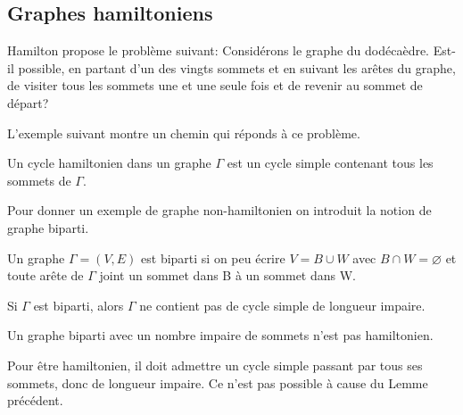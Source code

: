 
\subsection{Graphes hamiltoniens}

Hamilton propose le problème suivant: Considérons le graphe du dodécaèdre. Est-il possible, en partant d'un des vingts sommets et en suivant les arêtes du graphe, de visiter tous les sommets une et une seule fois et de revenir au sommet de départ? 

L'exemple suivant montre un chemin qui réponds à ce problème. 

\begin{exmp}

\end{exmp}



\newpage

\begin{defn}
Un cycle hamiltonien dans un graphe $\Gamma$ est un cycle simple contenant tous les sommets de $\Gamma$. 
\end{defn}

Pour donner un exemple de graphe non-hamiltonien on introduit la notion de graphe biparti. 

\begin{defn}
Un graphe $\Gamma = (V,E)$ est biparti si on peu écrire $V=B \cup W$ avec $B \cap W = \varnothing $ et toute arête de $\Gamma$ joint un sommet dans B à un sommet dans W.
\end{defn}

\begin{exmp}

\end{exmp}



\begin{lemme}
Si $\Gamma$ est biparti, alors $\Gamma$ ne contient pas de cycle simple de longueur impaire.
\end{lemme}

\begin{thrm}
Un graphe biparti avec un nombre impaire de sommets n'est pas hamiltonien.
\end{thrm}

\begin{demo}
Pour être hamiltonien, il doit admettre un cycle simple passant par tous ses sommets, donc de longueur impaire. Ce n'est pas possible à cause du Lemme précédent.
\end{demo}

